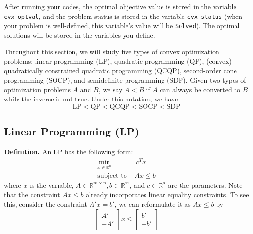 \documentclass[
]{book}
\theoremstyle{definition}
\theoremstyle{definition}
\theoremstyle{definition}
\theoremstyle{definition}
\theoremstyle{remark}
\begin{document}
After running your codes, the optimal objective value is stored in the variable \texttt{cvx\_optval}, and the problem status is stored in the variable \texttt{cvx\_status} (when your problem is well-defined, this variable's value will be \texttt{Solved}). The optimal solutions will be stored in the variables you define.

Throughout this section, we will study five types of convex optimization problems: linear programming (LP), quadratic programming (QP), (convex) quadratically constrained quadratic programming (QCQP), second-order cone programming (SOCP), and semidefinite programming (SDP). Given two types of optimization problems \(A\) and \(B\), we say \(A < B\) if \(A\) can always be converted to \(B\) while the inverse is not true. Under this notation, we have
\begin{equation*}
   \text{LP} < \text{QP} < \text{QCQP} < \text{SOCP} < \text{SDP}
\end{equation*}

\subsection{Linear Programming (LP)}\label{linear-programming-lp}

\textbf{Definition.} An LP has the following form:
\begin{equation}
   \label{eq:app-lpdef}
   \begin{aligned}
      \min_{x \in \mathbb{R}^n} & \ c^T x \\
      \text{subject to } & A x \le b  
   \end{aligned}
\end{equation}
where \(x\) is the variable, \(A \in \mathbb{R}^{m\times n}, b \in \mathbb{R}^m\), and \(c \in \mathbb{R}^n\) are the parameters. Note that the constraint \(A x \le b\) already incorporates linear equality constraints. To see this, consider the constraint \(A' x = b'\), we can reformulate it as \(A x \le b\) by
\begin{equation*}
   \begin{bmatrix}
      A' \\ -A'
   \end{bmatrix} x \le \begin{bmatrix}
      b' \\ -b'
   \end{bmatrix}
\end{equation*}
\end{document}
